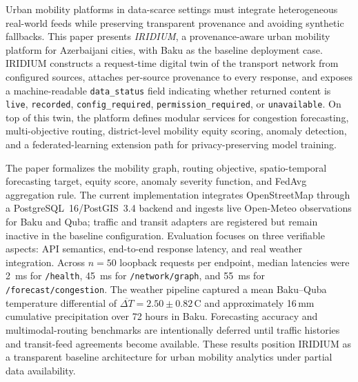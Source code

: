 Urban mobility platforms in data-scarce settings must integrate heterogeneous
real-world feeds while preserving transparent provenance and avoiding
synthetic fallbacks. This paper presents \textit{IRIDIUM}, a
provenance-aware urban mobility platform for Azerbaijani cities, with Baku
as the baseline deployment case. IRIDIUM constructs a request-time digital
twin of the transport network from configured sources, attaches per-source
provenance to every response, and exposes a machine-readable
\texttt{data\_status} field indicating whether returned content is
\texttt{live}, \texttt{recorded}, \texttt{config\_required},
\texttt{permission\_required}, or \texttt{unavailable}. On top of this
twin, the platform defines modular services for congestion forecasting,
multi-objective routing, district-level mobility equity scoring, anomaly
detection, and a federated-learning extension path for privacy-preserving
model training.

The paper formalizes the mobility graph, routing objective,
spatio-temporal forecasting target, equity score, anomaly severity
function, and FedAvg aggregation rule. The current implementation
integrates OpenStreetMap through a PostgreSQL~16/PostGIS~3.4 backend and
ingests live Open-Meteo observations for Baku and Quba; traffic and transit
adapters are registered but remain inactive in the baseline configuration.
Evaluation focuses on three verifiable aspects: API semantics, end-to-end
response latency, and real weather integration. Across $n=50$ loopback
requests per endpoint, median latencies were \SI{2}{ms} for
\texttt{/health}, \SI{45}{ms} for \texttt{/network/graph}, and
\SI{55}{ms} for \texttt{/forecast/congestion}. The weather pipeline
captured a mean Baku--Quba temperature differential of
$\overline{\Delta T} = 2.50 \pm 0.82$\,\textdegree{}C and approximately
16\,mm cumulative precipitation over 72 hours in Baku. Forecasting
accuracy and multimodal-routing benchmarks are intentionally deferred until
traffic histories and transit-feed agreements become available. These
results position IRIDIUM as a transparent baseline architecture for urban
mobility analytics under partial data availability.
